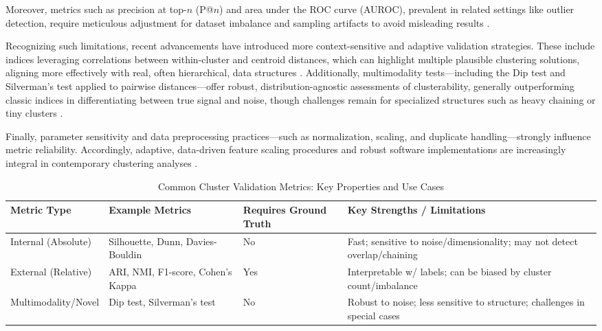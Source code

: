 \documentclass[sigconf]{acmart}
\begin{document}
Moreover, metrics such as precision at top-$n$ (P@$n$) and area under the ROC curve (AUROC), prevalent in related settings like outlier detection, require meticulous adjustment for dataset imbalance and sampling artifacts to avoid misleading results \cite{ref14}.

Recognizing such limitations, recent advancements have introduced more context-sensitive and adaptive validation strategies. These include indices leveraging correlations between within-cluster and centroid distances, which can highlight multiple plausible clustering solutions, aligning more effectively with real, often hierarchical, data structures \cite{ref17}. Additionally, multimodality tests—including the Dip test and Silverman’s test applied to pairwise distances—offer robust, distribution-agnostic assessments of clusterability, generally outperforming classic indices in differentiating between true signal and noise, though challenges remain for specialized structures such as heavy chaining or tiny clusters \cite{ref94,ref95}.

Finally, parameter sensitivity and data preprocessing practices—such as normalization, scaling, and duplicate handling—strongly influence metric reliability. Accordingly, adaptive, data-driven feature scaling procedures and robust software implementations are increasingly integral in contemporary clustering analyses \cite{ref95,ref96}.

\begin{table*}[htbp]
\centering
\caption{Common Cluster Validation Metrics: Key Properties and Use Cases}
\label{tab:validation_metrics}
\begin{adjustbox}{max width=\textwidth}
\begin{tabular}{llll}
\toprule
\textbf{Metric Type} & \textbf{Example Metrics} & \textbf{Requires Ground Truth} & \textbf{Key Strengths / Limitations} \\
\midrule
Internal (Absolute)  & Silhouette, Dunn, Davies-Bouldin & No  & Fast; sensitive to noise/dimensionality; may not detect overlap/chaining \\
External (Relative)  & ARI, NMI, F1-score, Cohen's Kappa & Yes & Interpretable w/ labels; can be biased by cluster count/imbalance        \\
Multimodality/Novel  & Dip test, Silverman's test         & No  & Robust to noise; less sensitive to structure; challenges in special cases \\
\bottomrule
\end{tabular}
\end{adjustbox}
\end{table*}
\end{document}
